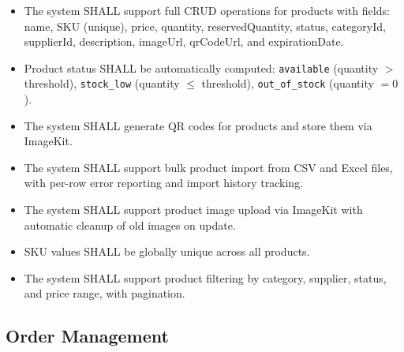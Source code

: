 \documentclass[12pt,a4paper]{report}
\begin{document}
\begin{tcolorbox}[reqbox,title={FR-PROD: Product Requirements}]
\begin{itemize}[leftmargin=1.5em]
  \item {} The system SHALL support full CRUD operations for products with fields: name, SKU (unique), price, quantity, reservedQuantity, status, categoryId, supplierId, description, imageUrl, qrCodeUrl, and expirationDate.
  \item {} Product status SHALL be automatically computed: \texttt{available} (quantity $>$ threshold), \texttt{stock\_low} (quantity $\leq$ threshold), \texttt{out\_of\_stock} (quantity $= 0$).
  \item {} The system SHALL generate QR codes for products and store them via ImageKit.
  \item {} The system SHALL support bulk product import from CSV and Excel files, with per-row error reporting and import history tracking.
  \item {} The system SHALL support product image upload via ImageKit with automatic cleanup of old images on update.
  \item {} SKU values SHALL be globally unique across all products.
  \item {} The system SHALL support product filtering by category, supplier, status, and price range, with pagination.
\end{itemize}
\end{tcolorbox}

\subsection{Order Management}
\end{document}
